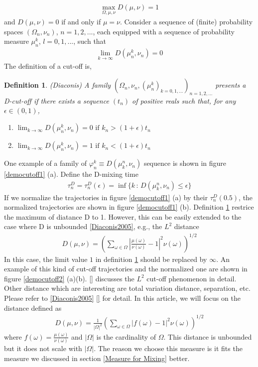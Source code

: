 \documentclass{article}
\newtheorem{definition}{Definition}
\begin{document}
\begin{eqnarray}
\max_{\Omega,\mu,\nu} D(\mu,\nu) = 1
\end{eqnarray}
and $D(\mu,\nu)=0$ if and only if $\mu=\nu$. Consider a sequence of
(finite) probability spaces $(\Omega_n,\nu_n)$, $n=1,2,...$, each
equipped with a sequence of probability measure $\mu^k_n$,
$l=0,1,...$, such that
\begin{eqnarray}
\lim_{k \rightarrow \infty} D(\mu^k_n,\nu_n)=0
\end{eqnarray}
The definition of a cut-off is,

\begin{definition}
\label{cutoffdefition}
(Diaconis) A family $(\Omega_n,\nu_n, (\mu^k_n)_{k=0,1,...})_{n=1,2,...}$
presents a D-cut-off if there exists a sequence $(t_n)$ of positive
reals such that, for any $\epsilon \in(0,1)$,
\begin{enumerate}
  \item $\lim_{k \rightarrow \infty}D(\mu^k_n,\nu_n) = 0 \mbox{ if }
  k_n>(1+\epsilon)t_n$
  \item $\lim_{k \rightarrow \infty}D(\mu^k_n,\nu_n) = 1 \mbox{ if }
  k_n<(1+\epsilon)t_n $
\end{enumerate}
\end{definition}

One example of a family of $\varphi^k_n \equiv D(\mu_k^n,\nu_n)$ sequence
is shown in figure \ref{democutoff1} (a). Define the D-mixing time
\begin{eqnarray}
\label{Dmixingtime}
\tau^D_n=\tau^D_n(\epsilon) = \inf\{k\,:\,D(\mu_k^n,\nu_n) \le \epsilon\}
\end{eqnarray}
If we normalize the trajectories in figure \ref{democutoff1} (a) by their $\tau_n^D(0.5)$, the
normalized trajectories are shown in figure \ref{democutoff1} (b).
Definition \ref{cutoffdefition} restrice the maximum of diatance D to 1.
However, this can be easily extended to the case where D is unbounded \ref{Diaconis2005},
e.g., the $L^2$ distance
\begin{eqnarray}
\label{L2distance}
 D(\mu,\nu) = \left(  \sum_{\omega \in \Omega} | \frac{\mu(\omega)}{\nu(\omega)}-1 |^2 \nu(\omega) \right)^{1/2}
\end{eqnarray}
In this case, the limit value $1$ in definition \ref{cutoffdefition} should be replaced by $\infty$.
An example of this kind of cut-off trajectories and the normalized one are shown in figure \ref{democutoff2} (a)(b). \ref{} discusses the
$L^2$ cut-off phenomenon in detail. Other distance which are interesting are total variation distance, separation, etc. Please refer to \ref{Diaconis2005} \ref{} for detail.
In this article, we will focus on the distance defined as
\begin{eqnarray}
\label{normalizedL2distance}
  D(\mu,\nu) = \frac{1}{|\Omega|^2}\left(  \sum_{\omega \in \Omega} | f(\omega)-1 |^2 \nu(\omega) \right)^{1/2}
\end{eqnarray}
where $f(\omega) = \frac{\mu(\omega)}{\nu(\omega)}$ and $|\Omega|$
is the cardinality of $\Omega$. This distance is unbounded but it
does not scale with $|\Omega|$. The reason we choose this measure is
it fits the measure we discussed in section \ref{Measure for Mixing}
better.
\end{document}
